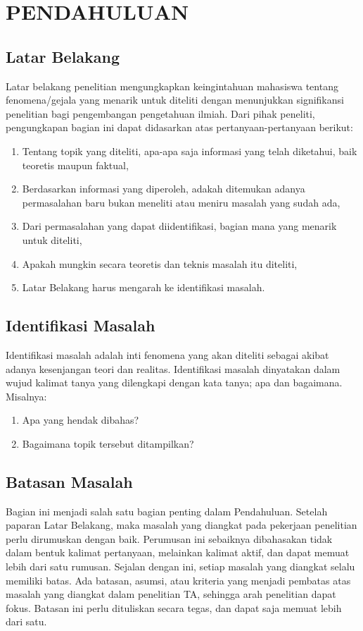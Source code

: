 \chapter{PENDAHULUAN}

\section{Latar Belakang}
Latar belakang penelitian mengungkapkan keingintahuan mahasiswa tentang fenomena/gejala yang menarik untuk diteliti dengan menunjukkan signifikansi penelitian bagi pengembangan pengetahuan ilmiah. Dari pihak peneliti, pengungkapan bagian ini dapat didasarkan atas pertanyaan-pertanyaan berikut: 
\begin{enumerate}
  \item Tentang topik yang diteliti, apa-apa saja informasi yang telah diketahui, baik teoretis maupun faktual,
  \item Berdasarkan informasi yang diperoleh, adakah ditemukan adanya permasalahan baru bukan meneliti atau meniru masalah yang sudah ada,
  \item Dari permasalahan yang dapat diidentifikasi, bagian mana yang menarik untuk diteliti,
  \item Apakah mungkin secara teoretis dan teknis masalah itu diteliti,
  \item Latar Belakang harus mengarah ke identifikasi masalah.
\end{enumerate}

\section{Identifikasi Masalah}
Identifikasi masalah adalah inti fenomena yang akan diteliti sebagai akibat adanya kesenjangan teori dan realitas. Identifikasi masalah dinyatakan dalam wujud kalimat tanya yang dilengkapi dengan kata tanya; apa dan bagaimana. Misalnya:
\begin{enumerate}
  \item Apa yang hendak dibahas?
  \item Bagaimana topik tersebut ditampilkan?
\end{enumerate}

\section{Batasan Masalah}
Bagian ini menjadi salah satu bagian penting dalam Pendahuluan. Setelah paparan Latar Belakang, maka masalah yang diangkat pada pekerjaan penelitian perlu dirumuskan dengan baik. Perumusan ini sebaiknya dibahasakan tidak dalam bentuk kalimat pertanyaan, melainkan kalimat aktif, dan dapat memuat lebih dari satu rumusan. Sejalan dengan ini, setiap masalah yang diangkat selalu memiliki batas. Ada batasan, asumsi, atau kriteria yang menjadi pembatas atas masalah yang diangkat dalam penelitian TA, sehingga arah penelitian dapat fokus. Batasan ini perlu dituliskan secara tegas, dan dapat saja memuat lebih dari satu.

